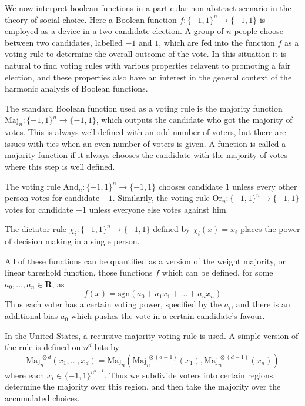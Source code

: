 We now interpret boolean functions in a particular non-abstract scenario in the theory of social choice. Here a Boolean function $f: \{ -1, 1 \}^n \to \{ -1, 1 \}$ is employed as a device in a two-candidate election. A group of $n$ people choose between two candidates, labelled $-1$ and $1$, which are fed into the function $f$ as a voting rule to determine the overall outcome of the vote. In this situation it is natural to find voting rules with various properties relavent to promoting a fair election, and these properties also have an interest in the general context of the harmonic analysis of Boolean functions.

\begin{example}
    The standard Boolean function used as a voting rule is the majority function $\text{Maj}_n: \{ -1, 1 \}^n \to \{ -1, 1 \}$, which outputs the candidate who got the majority of votes. This is always well defined with an odd number of voters, but there are issues with ties when an even number of voters is given. A function is called a majority function if it always chooses the candidate with the majority of votes where this step is well defined.
\end{example}

\begin{example}
    The voting rule $\text{And}_n: \{ -1, 1 \}^n \to \{ -1, 1 \}$ chooses candidate 1 unless every other person votes for candidate $-1$. Similarily, the voting rule $\text{Or}_n: \{ -1, 1 \}^n \to \{ -1, 1 \}$ votes for candidate $-1$ unless everyone else votes against him.
\end{example}

\begin{example}
    The dictator rule $\chi_i: \{ -1, 1 \}^n \to \{ -1, 1 \}$ defined by $\chi_i(x) = x_i$ places the power of decision making in a single person.
\end{example}

\begin{example}
    All of these functions can be quantified as a version of the weight majority, or linear threshold function, those functions $f$ which can be defined, for some $a_0, \dots, a_n \in \mathbf{R}$, as
    \[ f(x) = \text{sgn}(a_0 + a_1x_1 + \dots + a_nx_n) \]
    Thus each voter has a certain voting power, specified by the $a_i$, and there is an additional bias $a_0$ which pushes the vote in a certain candidate's favour.
\end{example}

\begin{example}
    In the United States, a recursive majority voting rule is used. A simple version of the rule is defined on $n^d$ bits by
    \[ \text{Maj}_n^{\ \otimes d}(x_1, \dots, x_d) = \text{Maj}_n(\text{Maj}^{\ \otimes (d-1)}_n(x_1), \text{Maj}^{\ \otimes (d-1)}_n(x_n)) \]
    where each $x_i \in \{ -1, 1 \}^{n^{d-1}}$. Thus we subdivide voters into certain regions, determine the majority over this region, and then take the majority over the accumulated choices.
\end{example}

